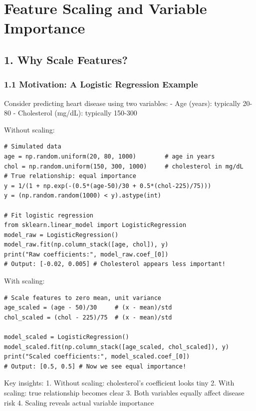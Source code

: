 \documentclass[11pt]{article}
\begin{document}
\section{Feature Scaling and Variable
Importance}\label{feature-scaling-and-variable-importance}

\subsection{1. Why Scale Features?}\label{why-scale-features}

\subsubsection{1.1 Motivation: A Logistic Regression
Example}\label{motivation-a-logistic-regression-example}

Consider predicting heart disease using two variables: - Age (years):
typically 20-80 - Cholesterol (mg/dL): typically 150-300

Without scaling:

\begin{verbatim}
# Simulated data
age = np.random.uniform(20, 80, 1000)        # age in years
chol = np.random.uniform(150, 300, 1000)     # cholesterol in mg/dL
# True relationship: equal importance
y = 1/(1 + np.exp(-(0.5*(age-50)/30 + 0.5*(chol-225)/75)))
y = (np.random.random(1000) < y).astype(int)

# Fit logistic regression
from sklearn.linear_model import LogisticRegression
model_raw = LogisticRegression()
model_raw.fit(np.column_stack([age, chol]), y)
print("Raw coefficients:", model_raw.coef_[0])
# Output: [-0.02, 0.005] # Cholesterol appears less important!
\end{verbatim}

With scaling:

\begin{verbatim}
# Scale features to zero mean, unit variance
age_scaled = (age - 50)/30     # (x - mean)/std
chol_scaled = (chol - 225)/75  # (x - mean)/std

model_scaled = LogisticRegression()
model_scaled.fit(np.column_stack([age_scaled, chol_scaled]), y)
print("Scaled coefficients:", model_scaled.coef_[0])
# Output: [0.5, 0.5] # Now we see equal importance!
\end{verbatim}

Key insights: 1. Without scaling: cholesterol's coefficient looks tiny
2. With scaling: true relationship becomes clear 3. Both variables
equally affect disease risk 4. Scaling reveals actual variable
importance
\end{document}

